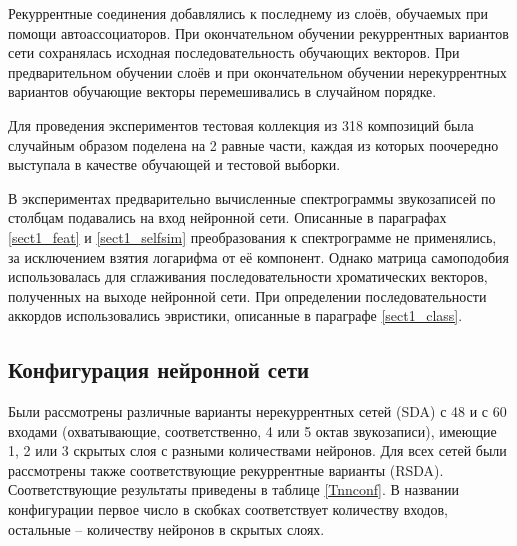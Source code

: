 Рекуррентные соединения добавлялись к последнему из слоёв, обучаемых при помощи
автоассоциаторов. При окончательном обучении рекуррентных вариантов сети
сохранялась исходная последовательность обучающих векторов. При предварительном
обучении слоёв и при окончательном обучении нерекуррентных вариантов обучающие
векторы перемешивались в случайном порядке.

Для проведения экспериментов тестовая коллекция из 318 композиций была случайным
образом поделена на 2 равные части, каждая из которых поочередно выступала в
качестве обучающей и тестовой выборки.

В экспериментах предварительно вычисленные спектрограммы звукозаписей по
столбцам подавались на вход нейронной сети. Описанные в параграфах
\ref{sect1_feat} и \ref{sect1_selfsim} преобразования к спектрограмме не
применялись, за исключением взятия логарифма от её компонент. Однако матрица
самоподобия использовалась для сглаживания последовательности хроматических
векторов, полученных на выходе нейронной сети. При определении
последовательности аккордов использовались эвристики, описанные в параграфе
\ref{sect1_class}.

\subsection{Конфигурация нейронной сети}

Были рассмотрены различные варианты нерекуррентных сетей (SDA) с 48 и с 60
входами (охватывающие, соответственно, 4 или 5 октав звукозаписи), имеющие 1, 2
или 3 скрытых слоя с разными количествами нейронов. Для всех сетей были
рассмотрены также соответствующие рекуррентные варианты (RSDA). Соответствующие
результаты приведены в таблице \ref{Tnnconf}. В названии конфигурации первое
число в скобках соответствует количеству входов, остальные -- количеству
нейронов в скрытых слоях.

